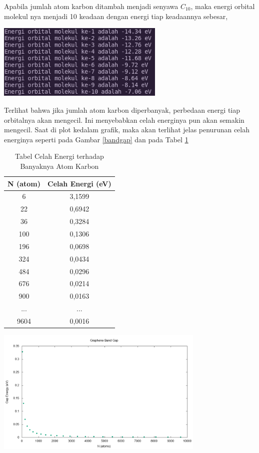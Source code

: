 \documentclass[12pt,a4paper]{report}
\begin{document}
Apabila jumlah atom karbon ditambah menjadi senyawa $C_{10}$, maka energi orbital molekul nya menjadi 10 keadaan dengan energi tiap keadaannya sebesar,
\begin{center}
	\includegraphics[width=8cm]{gambar/c10_energy.png}
	\label{c10_ernergy}
\end{center}
Terlihat bahwa jika jumlah atom karbon diperbanyak, perbedaan energi tiap orbitalnya akan mengecil. Ini menyebabkan celah energinya pun akan semakin mengecil. Saat di plot kedalam grafik, maka akan terlihat jelas penurunan celah energinya seperti pada Gambar \ref{bandgap} dan pada Tabel \ref{gaptable}
\begin{table}[h]
	\centering
	\caption{Tabel Celah Energi terhadap Banyaknya Atom Karbon}
	\label{gaptable}
	\begin{tabular}{|c|c|} 
		\hline
		N (atom) & Celah Energi (eV)\\ \hline
		6 & 3,1599 \\ \hline
		22 & 0,6942 \\ \hline
		36 & 0,3284 \\ \hline
		100 & 0,1306 \\ \hline
		196 & 0,0698 \\ \hline
		324 & 0,0434 \\ \hline
		484 & 0,0296 \\ \hline
		676 & 0,0214 \\ \hline
		900 & 0,0163 \\ \hline
		... & ... \\ \hline
		9604 & 0,0016 \\ \hline
	\end{tabular}
\end{table}
\begin{center}
	\includegraphics[width=10cm]{gambar/bandgap.png}
	\label{bandgap}
\end{center}
\end{document}
